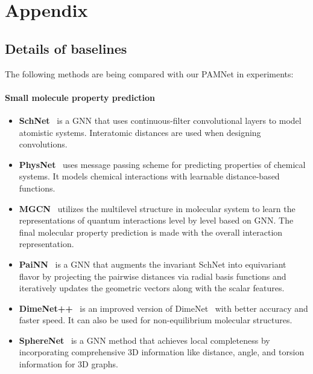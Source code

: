 \documentclass[fleqn,10pt]{wlscirep}
\begin{document}
\setcounter{table}{0}
\renewcommand{\thetable}{S\arabic{table}}

\section*{Appendix}

\subsection*{Details of baselines}
The following methods are being compared with our PAMNet in experiments:

\paragraph{Small molecule property prediction}
\begin{itemize}[leftmargin=10pt]
\item \textbf{SchNet}~\cite{schutt2018schnetpack} is a GNN that uses continuous-filter convolutional layers to model atomistic systems. Interatomic distances are used when designing convolutions.
\item \textbf{PhysNet}~\cite{unke2019physnet} uses message passing scheme for predicting properties of chemical systems. It models chemical interactions with learnable distance-based functions.
\item \textbf{MGCN}~\cite{lu2019molecular} utilizes the multilevel structure in molecular system to learn the representations of quantum interactions level by level based on GNN. The final molecular property prediction is made with the overall interaction representation.
\item \textbf{PaiNN}~\cite{schutt2021equivariant} is a GNN that augments the invariant SchNet into equivariant flavor by projecting the pairwise distances via radial basis functions and iteratively updates the geometric vectors along with the scalar features.
\item \textbf{DimeNet++}~\cite{klicpera_dimenetpp_2020} is an improved version of DimeNet~\cite{klicpera_dimenet_2020} with better accuracy and faster speed. It can also be used for non-equilibrium molecular structures.
\item \textbf{SphereNet}~\cite{liu2022spherical} is a GNN method that achieves local completeness by incorporating comprehensive 3D information like distance, angle, and torsion information for 3D graphs.
\end{itemize}
\end{document}
